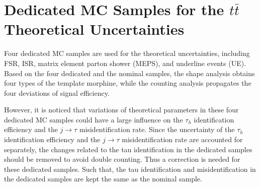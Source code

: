 \section{Dedicated MC Samples for the $t\bar{t}$ Theoretical Uncertainties}
\label{sec:app:ttSyst}



Four dedicated MC samples are used for the \ttbar theoretical uncertainties,
including FSR, ISR, matrix element parton shower (MEPS), and underline events (UE).
Based on the four dedicated and the nominal \ttbar samples,
the shape analysis obtains four types of the template morphine,
while the counting analysis propagates the four deviations of signal efficiency.

However, it is noticed that variations of theoretical parameters in these
four dedicated MC samples could have a large influence on the $\tau_h$ identification efficiency
and the $j\to \tau$ misidentification rate. 
Since the uncertainty of the $\tau_h$ identification efficiency and the $j\to \tau$ misidentification rate
are accounted for separately, the changes related to the tau identification 
in the dedicated \ttbar samples should be removed to avoid double counting.
Thus a correction is needed for these dedicated samples.
Such that, the tau identification and misidentification in the dedicated samples 
are kept the same as the nominal \ttbar sample.

